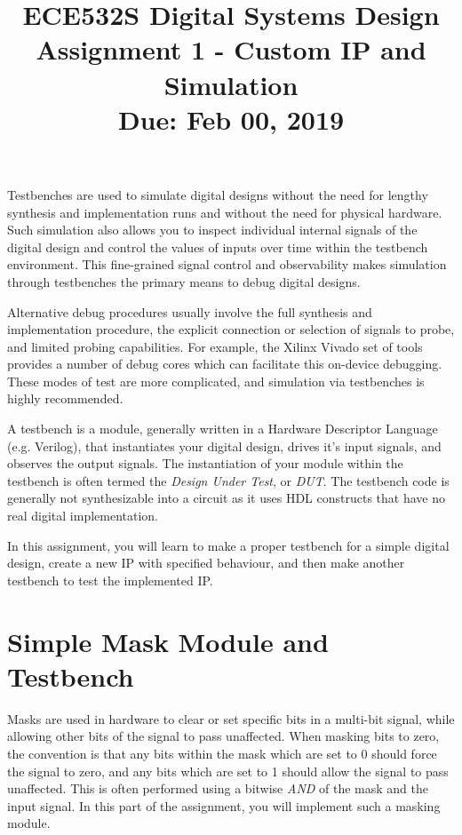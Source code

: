 \documentclass{article}
\title{ECE532S Digital Systems Design \\ \vspace{0.4cm}
       \Large Assignment 1 - Custom IP and Simulation \\ \vspace{0.4cm}
       \small Due: Feb 00, 2019}
\author{ }
\date{ }
\begin{document}
\maketitle
\vspace{-1cm}

Testbenches are used to simulate digital designs without the need for lengthy synthesis and implementation runs and without the need for physical hardware. Such simulation also allows you to inspect individual internal signals of the digital design and control the values of inputs over time within the testbench environment. This fine-grained signal control and observability makes simulation through testbenches the primary means to debug digital designs.

Alternative debug procedures usually involve the full synthesis and implementation procedure, the explicit connection or selection of signals to probe, and limited probing capabilities. For example, the Xilinx Vivado set of tools provides a number of debug cores which can facilitate this on-device debugging. These modes of test are more complicated, and simulation via testbenches is highly recommended.

A testbench is a module, generally written in a Hardware Descriptor Language (e.g. Verilog), that instantiates your digital design, drives it's input signals, and observes the output signals. The instantiation of your module within the testbench is often termed the \textit{Design Under Test}, or \textit{DUT}. The testbench code is generally not synthesizable into a circuit as it uses HDL constructs that have no real digital implementation.

In this assignment, you will learn to make a proper testbench for a simple digital design, create a new IP with specified behaviour, and then make another testbench to test the implemented IP.

\section{Simple Mask Module and Testbench}
\label{sec:mask}
Masks are used in hardware to clear or set specific bits in a multi-bit signal, while allowing other bits of the signal to pass unaffected. When masking bits to zero, the convention is that any bits within the mask which are set to 0 should force the signal to zero, and any bits which are set to 1 should allow the signal to pass unaffected. This is often performed using a bitwise \textit{AND} of the mask and the input signal. In this part of the assignment, you will implement such a masking module.
\end{document}

